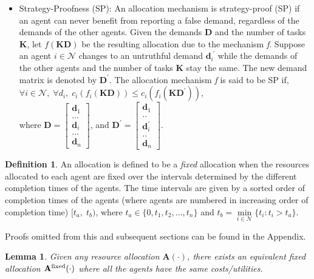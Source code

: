 \documentclass[letterpaper]{article} %
\newtheorem{lemma}{Lemma}
\theoremstyle{definition}
\newtheorem{definition}{Definition}
\begin{document}
\begin{itemize}
    \item Strategy-Proofness (SP): An allocation mechanism is strategy-proof (SP)  if an agent can never benefit from reporting a false demand, regardless of the demands of the other agents. Given the demands $\mathbf{D}$ and the number of tasks $\mathbf{K}$, let $f(\mathbf{KD})$ be the resulting allocation due to the mechanism \textit{f}. Suppose an agent $i \in \mathcal{N}$ changes to an untruthful demand $\mathbf{d}^{\;'}_{i}$ while the demands of the other agents and the number of tasks $\mathbf{K}$ stay the same. The new demand matrix is denoted by $\mathbf{D}^{'}$. The allocation mechanism \textit{f} is said to be SP if,
    \\$\forall i \in \mathcal{N}, \; \forall d_i, \; c_{i}(f_{i}(\mathbf{KD})) \leq c_{i}(f_{i}(\mathbf{KD}^{'}))$, \\[2 pt]where $\mathbf{D} = \begin{bmatrix} \mathbf{d}_{1} \\ ... \\ \mathbf{d}_{i} \\ ... \\ \mathbf{d}_{n}\end{bmatrix}$, and $\mathbf{D}^{'} = \begin{bmatrix} \mathbf{d}_{1} \\ .. \\ \mathbf{d}^{'}_{i} \\ .. \\ \mathbf{d}_{n}\end{bmatrix}$. 
    
\end{itemize}

\begin{definition}
An allocation is defined to be a \textit{fixed} allocation
when the resources allocated to each agent are fixed over the intervals determined by the different completion times of the agents. The time intervals are given by a sorted order of completion times of the agents (where agents are numbered in increasing order of completion time) $[t_{a}, \; t_{b})$, where $t_{a} \in \{0,t_{1},t_{2},...,t_{n}\}$ and $t_{b} = \underset{i \in \mathcal{N}}{\min} \{t_{i}: t_{i} > t_{a}\}$.
\end{definition}

Proofs omitted from this and subsequent sections can be found in the Appendix. 

\begin{lemma} \label{alloc-behavior}
Given any resource allocation $\mathbf{A}(\cdot)$, there exists an equivalent fixed allocation $\mathbf{A}^{\textnormal{fixed}}(\cdot)$ where all the agents have the same costs/utilities.
\end{lemma}
\end{document}
